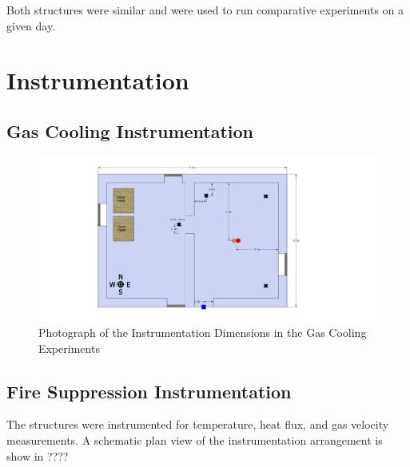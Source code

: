 \documentclass[12pt,oneside]{book}
\begin{document}
Both structures were similar and were used to run comparative experiments on a given day.

\section{Instrumentation}
\label{sec:Instrumentation}


\subsection{Gas Cooling Instrumentation} 
\label{subsec:Gas_Cooling_Instrumentation}

\begin{figure}[!ht]
	\includegraphics[width=6in]{../Figures/Pictures/DelCoBurnBuildingInstrumentation}
	\caption{Photograph of the Instrumentation Dimensions in the Gas Cooling Experiments}
	\label{fig:Gas_Cooling_Instrumentation_Dimensions}
\end{figure}

\subsection{Fire Suppression Instrumentation}
\label{subsec:Fire_Suppression_Instrumentation}

The structures were instrumented for temperature, heat flux, and gas velocity measurements.  A schematic plan view of the instrumentation arrangement is show in ???? 
\end{document}
